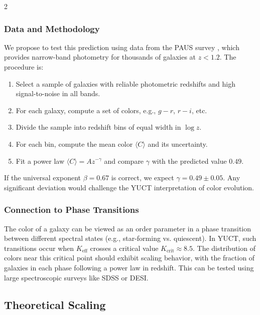 \documentclass[12pt,a4paper]{article}
\begin{document}
\begin{multicols}{2}
		\subsubsection{Data and Methodology}
		
		We propose to test this prediction using data from the PAUS survey \cite{Alarcon2019}, which provides narrow-band photometry for thousands of galaxies at \(z < 1.2\). The procedure is:
		\begin{enumerate}
			\item Select a sample of galaxies with reliable photometric redshifts and high signal-to-noise in all bands.
			\item For each galaxy, compute a set of colors, e.g., \(g-r\), \(r-i\), etc.
			\item Divide the sample into redshift bins of equal width in \(\log z\).
			\item For each bin, compute the mean color \(\langle C \rangle\) and its uncertainty.
			\item Fit a power law \(\langle C \rangle = A z^{-\gamma}\) and compare \(\gamma\) with the predicted value \(0.49\).
		\end{enumerate}
		
		If the universal exponent \(\beta = 0.67\) is correct, we expect \(\gamma = 0.49 \pm 0.05\). Any significant deviation would challenge the YUCT interpretation of color evolution.
		
		\subsubsection{Connection to Phase Transitions}
		
		The color of a galaxy can be viewed as an order parameter in a phase transition between different spectral states (e.g., star-forming vs. quiescent). In YUCT, such transitions occur when \(K_{\mathrm{eff}}\) crosses a critical value \(K_{\mathrm{crit}} \approx 8.5\). The distribution of colors near this critical point should exhibit scaling behavior, with the fraction of galaxies in each phase following a power law in redshift. This can be tested using large spectroscopic surveys like SDSS or DESI.
		
		\subsection{Theoretical Scaling}
		

\end{multicols}
\end{document}
